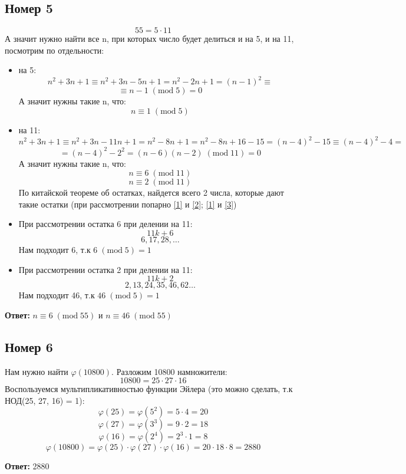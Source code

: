 \documentclass[a4paper,12pt]{article}
\begin{document}
\subsection*{Номер 5}
\[
55 = 5 \cdot 11
\]
А значит нужно найти все n, при которых число будет делиться и на 5, и на 11, посмотрим по отдельности:
\begin{itemize}
\item на 5:
\[
n^2 + 3n + 1 \equiv n^2 + 3n - 5n + 1 = n^2 - 2n + 1 = (n-1)^2 \equiv 
\]
\[
\equiv n -1 \; (\text{mod} \; 5)  = 0
\]
А значит нужны такие n, что:
\begin{equation}
\label{1}
n \equiv 1 \; (\text{mod} \; 5) 
\end{equation}
\item на 11:
\[
n^2 + 3n + 1 \equiv n^2 + 3n - 11n + 1 = n^2 - 8n + 1 = n^2 - 8n + 16 - 15 = (n-4)^2 - 15 \equiv (n-4)^2 - 4 = 
\]
\[
= (n-4)^2 - 2^2 = (n-6)(n-2)   \; (\text{mod} \; 11) = 0
\]
А значит нужны такие n, что:
\begin{equation}
\label{2}
n \equiv 6  \; (\text{mod} \; 11)
\end{equation}
\begin{equation}
\label{3}
n \equiv 2  \; (\text{mod} \; 11)
\end{equation}
По китайской теореме об остатках, найдется всего 2 числа, которые дают такие остатки (при рассмотрении попарно \ref{1} и \ref{2}; \ref{1} и \ref{3})

\item При рассмотрении остатка 6 при делении на 11:
\[
11k + 6
\]
\[
6, 17, 28, \ldots 
\]
Нам подходит 6, т.к $6 \; (\text{mod} \; 5) = 1$

\item При рассмотрении остатка 2 при делении на 11:
\[
11k + 2
\]
\[
2, 13, 24, 35, 46, 62 \ldots
\]
Нам подходит 46, т.к $46 \; (\text{mod} \; 5) = 1$
\end{itemize}
\begin{center}
\textbf{Ответ:} $n \equiv 6   \; (\text{mod} \; 55)$  и $n \equiv 46  \; (\text{mod} \; 55)$ 
\end{center}
\subsection*{Номер 6}
Нам нужно найти $\varphi(10800)$. Разложим 10800 намножители:
\[
10800 = 25 \cdot 27 \cdot 16
\]
Воспользуемся мультипликативностью функции Эйлера (это можно сделать, т.к НОД(25, 27, 16) = 1):
\[
\varphi(25) = \varphi(5^2) = 5 \cdot 4 = 20
\]
\[
\varphi(27) = \varphi(3^3) = 9 \cdot 2 = 18
\]
\[
\varphi(16)  = \varphi(2^4) = 2^3 \cdot 1 = 8
\]
\[
\varphi(10800) = \varphi(25) \cdot \varphi(27) \cdot \varphi(16) =  20 \cdot 18 \cdot 8 = 2880 
\] 
\begin{center}
\textbf{Ответ:} 2880
\end{center}
\end{document}

